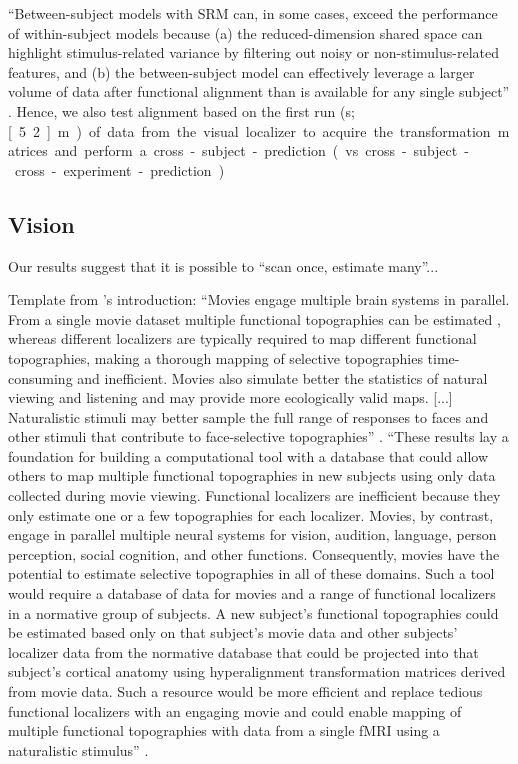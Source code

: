 %
``Between-subject models with SRM can, in some cases, exceed the performance of
within-subject models because (a) the reduced-dimension shared space can
highlight stimulus-related variance by filtering out noisy or
non-stimulus-related features, and (b) the between-subject model can effectively
leverage a larger volume of data after functional alignment than is available
for any single subject'' \citep{kumar2020brainiak}.
%
Hence, we also test alignment based on the first run (\unit[312]{s};
\unit[5.2]{m}) of data from
the visual localizer to acquire the transformation matrices and perform a
cross-subject-prediction (vs. cross-subject-cross-experiment-prediction)


\subsection{Vision}



Our results suggest that it is possible to ``scan once, estimate many''...

%
Template from \citet{jiahui2020predicting}'s introduction: ``Movies engage
multiple brain systems in parallel. From a single movie dataset multiple
functional topographies can be estimated \citep{guntupalli2016model}, whereas
different localizers are typically required to map different functional
topographies, making a thorough mapping of selective topographies time-consuming
and inefficient. Movies also simulate better the statistics of natural viewing
and listening and may provide more ecologically valid maps. [...] Naturalistic
stimuli may better sample the full range of responses to faces and other stimuli
that contribute to face-selective topographies'' \citep{jiahui2020predicting}.
%
``These results lay a foundation for building a computational tool with a
database that could allow others to map multiple functional topographies in new
subjects using only data collected during movie viewing. Functional localizers
are inefficient because they only estimate one or a few topographies for each
localizer. Movies, by contrast, engage in parallel multiple neural systems for
vision, audition, language, person perception, social cognition, and other
functions. Consequently, movies have the potential to estimate selective
topographies in all of these domains. Such a tool would require a database of
data for movies and a range of functional localizers in a normative group of
subjects. A new subject's functional topographies could be estimated based only
on that subject's movie data and other subjects' localizer data from the
normative database that could be projected into that subject's cortical anatomy
using hyperalignment transformation matrices derived from movie data. Such a
resource would be more efficient and replace tedious functional localizers with
an engaging movie and could enable mapping of multiple functional topographies
with data from a single fMRI using a naturalistic stimulus''
\citet{jiahui2020predicting}.


